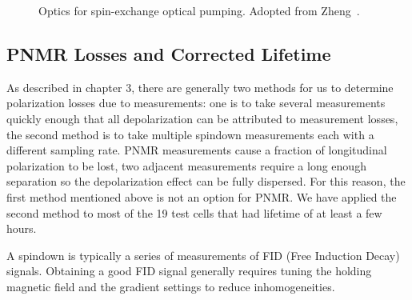\begin{figure}[t!]
	\centering
	\caption{{Optics for spin-exchange optical pumping. Adopted from Zheng~\cite{YuanThesis}.}}
	\label{optics}
\end{figure}

\subsection{PNMR Losses and Corrected Lifetime}

As described in chapter 3, there are generally two methods for us to determine polarization losses due to measurements: one is to take several measurements quickly enough that all depolarization can be attributed to measurement losses, the second method is to take multiple spindown measurements each with a different sampling rate. PNMR measurements cause a fraction of longitudinal polarization to be lost, two adjacent measurements require a long enough separation so the depolarization effect can be fully dispersed. For this reason, the first method mentioned above is not an option for PNMR. We have applied the second method to most of the 19 test cells that had lifetime of at least a few hours.

A spindown is typically a series of measurements of FID (Free Induction Decay) signals. Obtaining a good FID signal generally requires tuning the holding magnetic field and the gradient settings to reduce inhomogeneities.

